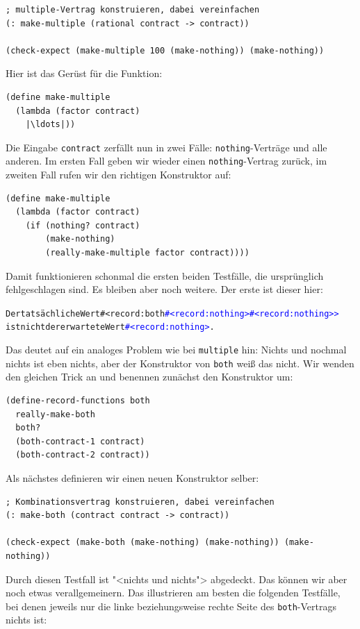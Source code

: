 %
\begin{lstlisting}
; multiple-Vertrag konstruieren, dabei vereinfachen
(: make-multiple (rational contract -> contract))

(check-expect (make-multiple 100 (make-nothing)) (make-nothing))
\end{lstlisting}
%
Hier ist das Gerüst für die Funktion:
%
\begin{lstlisting}
(define make-multiple
  (lambda (factor contract)
    |\ldots|))
\end{lstlisting}
%
Die Eingabe \lstinline{contract} zerfällt nun in zwei Fälle:
\lstinline{nothing}-Verträge und alle anderen.  Im ersten Fall geben
wir wieder einen \lstinline{nothing}-Vertrag zurück, im zweiten Fall
rufen wir den richtigen Konstruktor auf:
%
\begin{lstlisting}
(define make-multiple
  (lambda (factor contract)
    (if (nothing? contract)
        (make-nothing)
        (really-make-multiple factor contract))))
\end{lstlisting}
%
Damit funktionieren schonmal die ersten beiden Testfälle, die
ursprünglich fehlgeschlagen sind.  Es bleiben aber noch weitere.  Der erste
ist dieser hier:
%
\begin{alltt}
Der tatsächliche Wert #<record:both \textcolor{blue}{#<record:nothing> #<record:nothing>>}
ist nicht der erwartete Wert \textcolor{blue}{#<record:nothing>}.
\end{alltt}
%
Das deutet auf ein analoges Problem wie bei \lstinline{multiple} hin:
Nichts und nochmal nichts ist eben nichts, aber der Konstruktor von
\lstinline{both} weiß das nicht.  Wir wenden den gleichen Trick an und
benennen zunächst den Konstruktor um:
%
\begin{lstlisting}
(define-record-functions both
  really-make-both
  both?
  (both-contract-1 contract)
  (both-contract-2 contract))  
\end{lstlisting}
%
Als nächstes definieren wir einen neuen Konstruktor selber:
%
\begin{lstlisting}
; Kombinationsvertrag konstruieren, dabei vereinfachen
(: make-both (contract contract -> contract))

(check-expect (make-both (make-nothing) (make-nothing)) (make-nothing))
\end{lstlisting}
%
Durch diesen Testfall ist "<nichts und nichts"> abgedeckt.  Das können
wir aber noch etwas verallgemeinern.  Das illustrieren am besten die
folgenden Testfälle, bei denen jeweils nur die linke beziehungsweise
rechte Seite des \lstinline{both}-Vertrags nichts ist:
